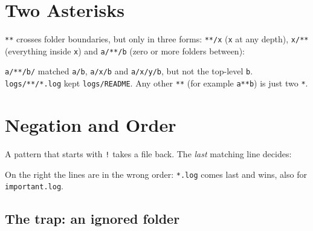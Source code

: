 \documentclass[11pt,a4paper]{article}
\begin{document}
\section{Two Asterisks}
\label{sec:two}


\texttt{**} crosses folder boundaries, but only in three forms: \texttt{**/x} (\texttt{x} at any depth),
\texttt{x/**} (everything inside \texttt{x}) and \texttt{a/**/b} (zero or more folders between):


\texttt{a/**/b/} matched \texttt{a/b}, \texttt{a/x/b} and \texttt{a/x/y/b}, but not the top-level \texttt{b}.
\texttt{logs/**/*.log} kept \texttt{logs/README}. Any other \texttt{**} (for example \texttt{a**b}) is just two \texttt{*}.



\section{Negation and Order}
\label{sec:order}


A pattern that starts with \texttt{!} takes a file back. The \emph{last} matching line decides:

\noindent
\begin{minipage}[t]{0.49\linewidth}

\end{minipage}\hfill
\begin{minipage}[t]{0.49\linewidth}

\end{minipage}

On the right the lines are in the wrong order: \texttt{*.log} comes last and wins, also for \texttt{important.log}.


\subsection*{The trap: an ignored folder}


\noindent
\begin{minipage}[t]{0.49\linewidth}

\end{minipage}\hfill
\begin{minipage}[t]{0.49\linewidth}

\end{minipage}
\end{document}
